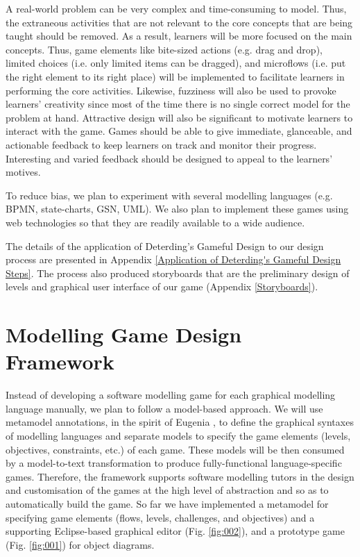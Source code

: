 \documentclass[12pt, a4paper]{report}
\begin{document}
A real-world problem can be very complex and time-consuming to model. Thus, the extraneous activities that are not relevant to the core concepts that are being taught should be removed. As a result, learners will be more focused on the main concepts. Thus, game elements like bite-sized actions (e.g. drag and drop), limited choices (i.e. only limited items can be dragged), and microflows (i.e. put the right element to its right place) will be implemented to facilitate learners in performing the core activities. Likewise, fuzziness will also be used to provoke learners' creativity since most of the time there is no single correct model for the problem at hand. Attractive design will also be significant to motivate learners to interact with the game. Games should be able to give immediate, glanceable, and actionable feedback to keep learners on track and monitor their progress. Interesting and varied feedback should be designed to appeal to the learners' motives. 

To reduce bias, we plan to experiment with several modelling languages (e.g. BPMN, state-charts, GSN, UML). We also plan to implement these games using web technologies so that they are readily available to a wide audience.

The details of the application of Deterding's Gameful Design to our design process are presented in Appendix \ref{Application of Deterding's Gameful Design Steps}. The process also produced storyboards that are the preliminary design of levels and graphical user interface of our game (Appendix \ref{Storyboards}).      

\section{Modelling Game Design Framework}
Instead of developing a software modelling game for each graphical modelling language manually, we plan to follow a model-based approach. We will use metamodel annotations, in the spirit of Eugenia \cite{kolovos2015eugenia}, to define the graphical syntaxes of modelling languages and separate models to specify the game elements (levels, objectives, constraints, etc.) of each game. These models will be then consumed by a model-to-text transformation to produce fully-functional language-specific games. Therefore, the framework supports software modelling tutors in the design and customisation of the games at the high level of abstraction and so as to automatically build the game. So far we have implemented a metamodel for specifying game elements (flows, levels, challenges, and objectives) and a supporting Eclipse-based graphical editor (Fig. \ref{fig:002}), and a prototype game (Fig. \ref{fig:001}) for object diagrams. 
\end{document}
